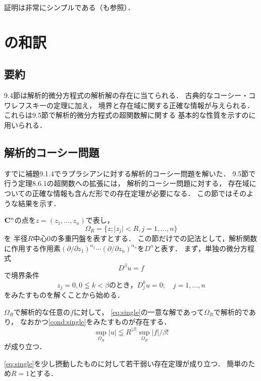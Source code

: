 証明は非常にシンプルである（\cite[Thm9.4.7]{Hor83}も参照）．
\section{\cite[9.4]{Hor83}の和訳}
\subsection*{要約}
9.4節は解析的微分方程式の解析解の存在に当てられる．
古典的なコーシー・コワレフスキーの定理に加え，
境界と存在域に関する正確な情報が与えられる．
これらは9.5節で解析的微分方程式の超関数解に関する
基本的な性質を示すのに用いられる．

\subsection{解析的コーシー問題}
すでに補題9.1.4でラプラシアンに対する解析的コーシー問題を解いた．
9.5節で行う定理8.6.1の超関数への拡張には，
解析的コーシー問題に対する，
存在域についての正確な情報も含んだ形での存在定理が必要になる．
この節ではそのような結果を示す．

$\mathbf{C}^n$の点を\(z=(z_1,\dots,z_n)\)で表し，
\[
    \Omega_R=\{z;\lvert z_j\rvert<R,j=1,\dots,n\}
\]を
半径\(R\)中心0の多重円盤を表すとする．
この節だけでの記法として，解析関数に作用する作用素\(
    (\partial/\partial z_1)^{\alpha_1}
    \cdots(\partial/\partial z_n)^{\alpha_n}
\)を\(D^\alpha\)と表す．
まず，単独の微分方程式
\begin{equation}
    D^\beta u=f\label{eq:single}
\end{equation}
で境界条件
\begin{equation}\label{cond:single}
    z_j=0, 0\leqq k<\beta\text{のとき，}D_j^ku=0;\quad j=1,\dots,n
\end{equation}
をみたすものを解くことから始める．

\begin{LMM}
    \(\Omega_R\)で解析的な任意の\(f\)に対して，
    \eqref{eq:single}の一意な解であって\(\Omega_R\)で解析的であり，
    なおかつ\eqref{cond:single}をみたすものが存在する．
    \begin{equation}\label{eval1}
        \sup_{\Omega_R}\lvert u\rvert
        \leqq R^{\lvert\beta\rvert}\sup_{\Omega_R}\lvert f\rvert/\beta!
    \end{equation}
    が成り立つ．
\end{LMM}

\eqref{eq:single}を少し摂動したものに対して若干弱い存在定理が成り立つ．
簡単のため\(R=1\)とする．

